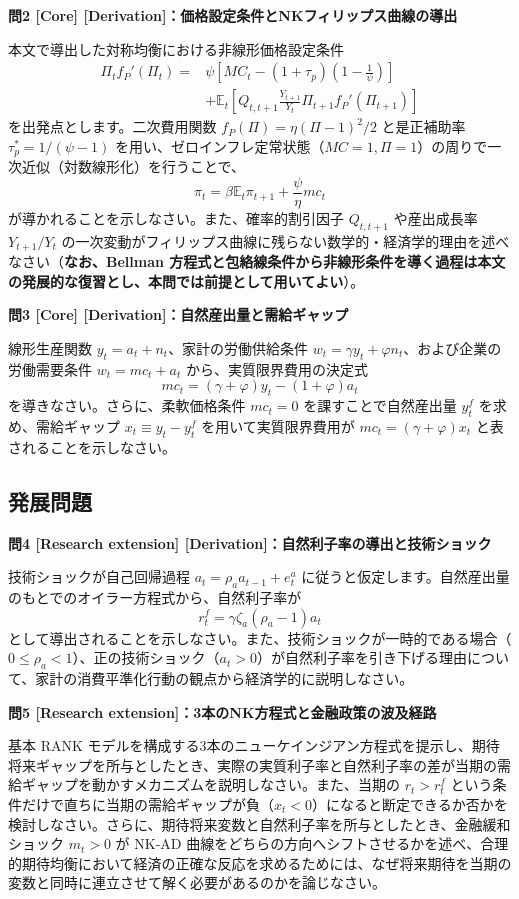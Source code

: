 \documentclass[
  japanese,
  lualatex,
  ja=standard,
  12pt,
  a4paper]{ltjsarticle}
\begin{document}
\textbf{問2 {[}Core{]}
{[}Derivation{]}：価格設定条件とNKフィリップス曲線の導出}

本文で導出した対称均衡における非線形価格設定条件 \[
\begin{aligned}
\Pi_tf_P'(\Pi_t)={}&
\psi\left[
MC_t-(1+\tau_p)\left(1-\frac{1}{\psi}\right)
\right]\\
&+\mathbb{E}_t\left[
Q_{t,t+1}\frac{Y_{t+1}}{Y_t}
\Pi_{t+1}f_P'(\Pi_{t+1})
\right]
\end{aligned}
\] を出発点とします。二次費用関数 \(f_P(\Pi)=\eta(\Pi-1)^2/2\)
と是正補助率 \(\tau_p^*=1/(\psi-1)\)
を用い、ゼロインフレ定常状態（\(MC=1, \Pi=1\)）の周りで一次近似（対数線形化）を行うことで、
\[
\pi_t
=\beta\mathbb{E}_t\pi_{t+1}
+\frac{\psi}{\eta}mc_t
\] が導かれることを示しなさい。また、確率的割引因子 \(Q_{t,t+1}\)
や産出成長率 \(Y_{t+1}/Y_t\)
の一次変動がフィリップス曲線に残らない数学的・経済学的理由を述べなさい（\textbf{なお、Bellman
方程式と包絡線条件から非線形条件を導く過程は本文の発展的な復習とし、本問では前提として用いてよい}）。

\Needspace{0.18\textheight}

\textbf{問3 {[}Core{]} {[}Derivation{]}：自然産出量と需給ギャップ}

線形生産関数 \(y_t=a_t+n_t\)、家計の労働供給条件
\(w_t=\gamma y_t+\varphi n_t\)、および企業の労働需要条件
\(w_t=mc_t+a_t\) から、実質限界費用の決定式 \[
mc_t=(\gamma+\varphi)y_t-(1+\varphi)a_t
\] を導きなさい。さらに、柔軟価格条件 \(mc_t=0\) を課すことで自然産出量
\(y_t^f\) を求め、需給ギャップ \(x_t \equiv y_t - y_t^f\)
を用いて実質限界費用が \(mc_t=(\gamma+\varphi)x_t\)
と表されることを示しなさい。

\Needspace{0.18\textheight}

\subsection{発展問題}\label{ux767aux5c55ux554fux984c}

\textbf{問4 {[}Research extension{]}
{[}Derivation{]}：自然利子率の導出と技術ショック}

技術ショックが自己回帰過程 \(a_t=\rho_a a_{t-1}+e_t^a\)
に従うと仮定します。自然産出量のもとでのオイラー方程式から、自然利子率が
\[
r_t^f=\gamma\zeta_a(\rho_a-1)a_t
\]
として導出されることを示しなさい。また、技術ショックが一時的である場合（\(0\leq\rho_a<1\)）、正の技術ショック（\(a_t>0\)）が自然利子率を引き下げる理由について、家計の消費平準化行動の観点から経済学的に説明しなさい。

\Needspace{0.18\textheight}

\textbf{問5 {[}Research extension{]}：3本のNK方程式と金融政策の波及経路}

基本 RANK
モデルを構成する3本のニューケインジアン方程式を提示し、期待将来ギャップを所与としたとき、実際の実質利子率と自然利子率の差が当期の需給ギャップを動かすメカニズムを説明しなさい。また、当期の
\(r_t>r_t^f\)
という条件だけで直ちに当期の需給ギャップが負（\(x_t<0\)）になると断定できるか否かを検討しなさい。さらに、期待将来変数と自然利子率を所与としたとき、金融緩和ショック
\(m_t>0\) が NK-AD
曲線をどちらの方向へシフトさせるかを述べ、合理的期待均衡において経済の正確な反応を求めるためには、なぜ将来期待を当期の変数と同時に連立させて解く必要があるのかを論じなさい。
\end{document}
